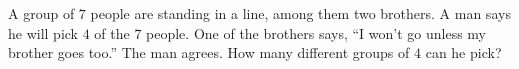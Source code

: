 A group of $7$ people are standing in a line, among them two brothers. A man says he will pick $4$ of the $7$ people. One of the brothers says, ``I won't go unless my brother goes too.'' The man agrees. How many different groups of $4$ can he pick?
